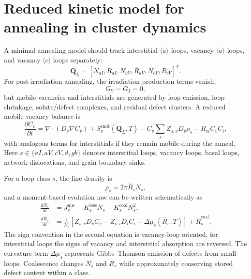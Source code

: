 \documentclass[11pt]{article}
\begin{document}
\section{Reduced kinetic model for annealing in cluster dynamics}

A minimal annealing model should track interstitial $\langle a\rangle$ loops, vacancy $\langle a\rangle$ loops, and vacancy $\langle c\rangle$ loops separately:
\begin{equation}
 \bm Q_L = \left[N_{aI},\bar R_{aI},N_{aV},\bar R_{aV},N_{cV},\bar R_{cV}\right]^T.
\end{equation}
For post-irradiation annealing, the irradiation production terms vanish,
\begin{equation}
  G_V=G_I=0,
\end{equation}
but mobile vacancies and interstitials are generated by loop emission, loop shrinkage, solute/defect complexes, and residual defect clusters.  A reduced mobile-vacancy balance is
\begin{equation}
  \frac{\partial C_v}{\partial t} = \nabla\cdot(D_v\nabla C_v)
  + S_v^{\mathrm{emit}}(\bm Q_L,T)
  - C_v\sum_s Z_{s,v}D_v\rho_s
  - R_{vi}C_vC_i,
\end{equation}
with analogous terms for interstitials if they remain mobile during the anneal.  Here $s\in\{aI,aV,cV,d,gb\}$ denotes interstitial loops, vacancy loops, basal loops, network dislocations, and grain-boundary sinks.

For a loop class $s$, the line density is
\begin{equation}
  \rho_s = 2\pi \bar R_s N_s,
\end{equation}
and a moment-based evolution law can be written schematically as
\begin{align}
  \frac{dN_s}{dt} &= J_s^{\mathrm{nuc}} - K_s^{\mathrm{loss}}N_s - K_s^{\mathrm{coal}}N_s^2,\\
  \frac{d\bar R_s}{dt} &= \frac{1}{\mathcal G_s}\left[Z_{s,v}D_vC_v-Z_{s,i}D_iC_i-\Delta\mu_s(\bar R_s,T)\right] + \dot R_s^{\mathrm{coal}}.
\end{align}
The sign convention in the second equation is vacancy-loop oriented; for interstitial loops the signs of vacancy and interstitial absorption are reversed.  The curvature term $\Delta\mu_s$ represents Gibbs--Thomson emission of defects from small loops.  Coalescence changes $N_s$ and $\bar R_s$ while approximately conserving stored defect content within a class.
\end{document}
